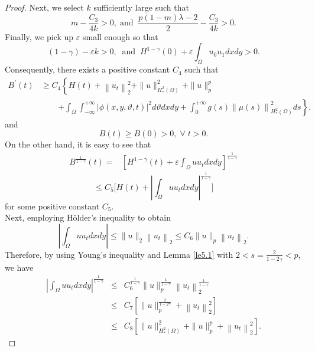 \documentclass[12pt]{article}
\numberwithin{equation}{section}
\begin{document}
\begin{proof}
Next, we select $k$ sufficiently large such that
$$m-\frac{C_{3}}{4 k}>0,\;\text{and}\;\; \frac{p(1-m)\lambda -2}{2}-\frac{C_{3}}{4k}>0.$$
Finally, we pick up $\varepsilon$ small enough so that
$$(1-\gamma) - \varepsilon k > 0,\;\;\text{and}\;\;H^{1-\gamma}(0)+\varepsilon \int_{\Omega} u_{0} u_{1} dx dy>0.
$$
Consequently, there exists a positive constant $C_4$ such that
\begin{align}\label{eq5.21}
B^{\prime}(t)&\geq C_4\left\{H(t)+\left\|u_{t}\right\|_{2}^{2}+\|u\|^{2}_{H^2_{*}(\Omega)}+\|u\|_{p}^{p}\right.\nonumber \\
&\quad\;\;\;\;\left.+\int_{\Omega} \int_{-\infty}^{+\infty}|\phi(x,y,\vartheta,t)|^{2} d\vartheta dx dy+\int_{0}^{+\infty} g(s)\left\|\mu(s)\right\|^2_{H^2_{*}(\Omega)} ds\right\}.
\end{align}
and
\begin{equation}\label{GrindEQ__66_}
B(t)\geq B(0)>0,\;\forall\;t>0.
\end{equation}
On the other hand, it is easy to see that
\begin{equation}\label{GrindEQ__67_}
\begin{aligned}
B^{\frac{1}{1-\gamma}}(t)= & \left[H^{1-\gamma}(t)+\varepsilon \int_{\Omega} u u_{t} dx dy \right]^{\frac{1}{1-\gamma}}
\end{aligned}
\end{equation}
\begin{equation}
    \leq C_5\Big[H(t)+\left|\int_{\Omega} u u_{t} dx dy\right|^{\frac{1}{1-\gamma}}\Big]
    \label{eq68}
\end{equation}
for some positive constant $C_5$.\\
Next, employing H\"{o}lder's inequality to obtain
\begin{equation*}\label{eq69}
\left| \int_{\Omega} u u_{t} dx dy \right| \leq\|u\|_{2} \left\|u_{t}\right\|_{2} \leq C_6 \|u\|_{p} \left\|u_{t}\right\|_{2}.
\end{equation*}
Therefore, by using Young's inequality and Lemma \ref{le5.1} with $2<s=\frac{2}{1-2\gamma}<p$, we have
\begin{eqnarray}\label{eq699}
\left|\int_{\Omega} u u_{t} dx dy\right|^{\frac{1}{1-\gamma}} &\leq& C^{\frac{1}{1-\gamma}}_6\|u\|_{p}^{\frac{1}{1-\gamma}} \left\|u_{t}\right\|_{2}^{\frac{1}{1-\gamma}} \nonumber\\
&\leq& C_7\left[\|u\|_{p}^{\frac{2}{1-2\gamma}}+\left\|u_{t}\right\|_{2}^2\right]\nonumber\\
&\leq& C_8 \left[ \|u\|^2_{H^2_*(\Omega)}+\|u\|_{p}^{p}+\left\|u_{t}\right\|_{2}^{2}\right].

\end{eqnarray}
\end{proof}
\end{document}
